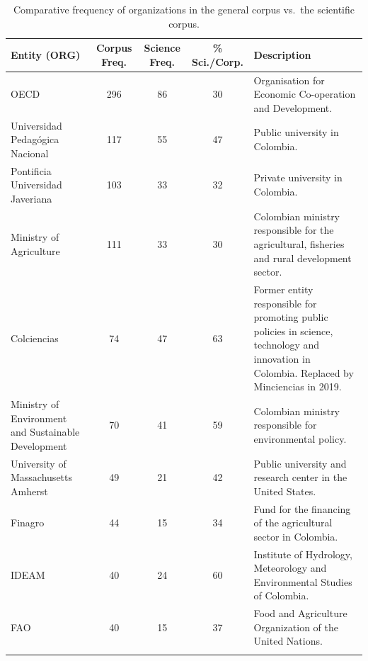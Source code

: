\documentclass[pdflatex,sn-mathphys-num,iicol]{sn-jnl}
\begin{document}
	\begin{table}[h!]
		\caption{Comparative frequency of organizations in the general corpus vs.\ the scientific corpus.}
		\label{tab:ents_org}
		{\footnotesize
			\begin{tabular}{@{}p{3.5cm}cccP{5cm}@{}}
				\toprule
				\textbf{Entity (ORG)} & \textbf{Corpus Freq.} & \textbf{Science Freq.} & \textbf{\% Sci./Corp.} & \textbf{Description} \\
				\midrule
				OECD                             & 296 & 86 & 30 & Organisation for Economic Co-operation and Development. \\
				Universidad Pedag{\'o}gica Nacional & 117 & 55 & 47 & Public university in Colombia. \\
				Pontificia Universidad Javeriana & 103 & 33 & 32 & Private university in Colombia. \\
				Ministry of Agriculture          & 111 & 33 & 30 & Colombian ministry responsible for the agricultural, fisheries and rural development sector. \\
				Colciencias                      & 74  & 47 & 63 & Former entity responsible for promoting public policies in science, technology and innovation in Colombia. Replaced by Minciencias in 2019. \\
				Ministry of Environment and Sustainable Development & 70 & 41 & 59 & Colombian ministry responsible for environmental policy. \\
				University of Massachusetts Amherst & 49 & 21 & 42 & Public university and research center in the United States. \\
				Finagro                          & 44  & 15 & 34 & Fund for the financing of the agricultural sector in Colombia. \\
				IDEAM                            & 40  & 24 & 60 & Institute of Hydrology, Meteorology and Environmental Studies of Colombia. \\
				FAO                              & 40  & 15 & 37 & Food and Agriculture Organization of the United Nations. \\
				\botrule
			\end{tabular}
		}
	\end{table}
	
\end{document}
